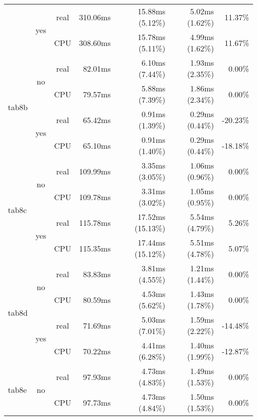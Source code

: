 \documentclass[en]{pracamgr}
\begin{document}
\begin{appendices}
\begin{small}
\begin{longtable}{|l|c|c|r|r|r|r|}
                          \cline{2-7}
                          & \multirow{2}{*}{yes} & real & 310.06ms & 15.88ms (5.12\%) & 5.02ms (1.62\%) & 11.37\% \\*
                          &                      & CPU  & 308.60ms & 15.78ms (5.11\%) & 4.99ms (1.62\%) & 11.67\% \\
\hline
\multirow{4}{*}{tab8b}    & \multirow{2}{*}{no}  & real & 82.01ms & 6.10ms (7.44\%) & 1.93ms (2.35\%) & 0.00\% \\*
                          &                      & CPU  & 79.57ms & 5.88ms (7.39\%) & 1.86ms (2.34\%) & 0.00\% \\*
                          \cline{2-7}
                          & \multirow{2}{*}{yes} & real & 65.42ms & 0.91ms (1.39\%) & 0.29ms (0.44\%) & -20.23\% \\*
                          &                      & CPU  & 65.10ms & 0.91ms (1.40\%) & 0.29ms (0.44\%) & -18.18\% \\
\hline
\multirow{4}{*}{tab8c}    & \multirow{2}{*}{no}  & real & 109.99ms & 3.35ms (3.05\%) & 1.06ms (0.96\%) & 0.00\% \\*
                          &                      & CPU  & 109.78ms & 3.31ms (3.02\%) & 1.05ms (0.95\%) & 0.00\% \\*
                          \cline{2-7}
                          & \multirow{2}{*}{yes} & real & 115.78ms & 17.52ms (15.13\%) & 5.54ms (4.79\%) & 5.26\% \\*
                          &                      & CPU  & 115.35ms & 17.44ms (15.12\%) & 5.51ms (4.78\%) & 5.07\% \\
\hline
\multirow{4}{*}{tab8d}    & \multirow{2}{*}{no}  & real & 83.83ms & 3.81ms (4.55\%) & 1.21ms (1.44\%) & 0.00\% \\*
                          &                      & CPU  & 80.59ms & 4.53ms (5.62\%) & 1.43ms (1.78\%) & 0.00\% \\*
                          \cline{2-7}
                          & \multirow{2}{*}{yes} & real & 71.69ms & 5.03ms (7.01\%) & 1.59ms (2.22\%) & -14.48\% \\*
                          &                      & CPU  & 70.22ms & 4.41ms (6.28\%) & 1.40ms (1.99\%) & -12.87\% \\
\hline
\multirow{4}{*}{tab8e}    & \multirow{2}{*}{no}  & real & 97.93ms & 4.73ms (4.83\%) & 1.49ms (1.53\%) & 0.00\% \\*
                          &                      & CPU  & 97.73ms & 4.73ms (4.84\%) & 1.50ms (1.53\%) & 0.00\% \\*

\end{longtable}
\end{small}
\end{appendices}
\end{document}
